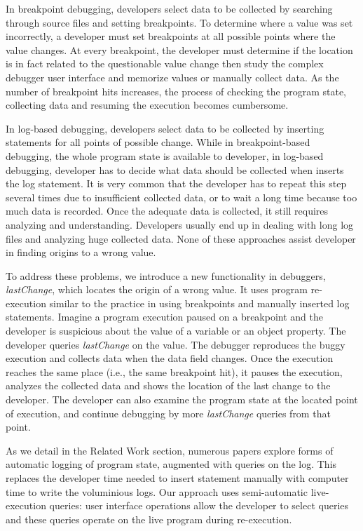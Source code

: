 \documentclass[runningheads,a4paper]{llncs}
\begin{document}
In breakpoint debugging, developers select data to be collected by
searching through source files and setting breakpoints. To determine
where a value was set incorrectly, a developer must set
breakpoints at all possible points where the value changes. At
every breakpoint, the developer must determine if the location is in
fact related to the questionable value change then study the complex
debugger user interface and memorize values or manually collect
data. As the number of breakpoint hits increases, the process of
checking the program state, collecting data and resuming the execution
becomes cumbersome.

In log-based debugging, developers select data to be collected by
inserting statements for all points of possible change.  While in
breakpoint-based debugging, the whole program state is available to
developer, in log-based debugging, developer has to decide what data
should be collected when inserts the log statement. It is very common
that the developer has to repeat this step several times due to
insufficient collected data, or to wait a long time because too much
data is recorded. Once the adequate data is collected, it still
requires analyzing and understanding. Developers usually end up in
dealing with long log files and analyzing huge collected data.  None
of these approaches assist developer in finding origins to a wrong
value.

To address these problems, we introduce a new functionality in
debuggers, \textit{lastChange}, which locates the origin of a wrong
value. It uses program re-execution similar to the practice
in using breakpoints and manually inserted log statements. 
Imagine a program execution 
paused on a breakpoint and the developer is
suspicious about the value of a variable or an object property. The
developer queries \textit{lastChange} on the value. The debugger
reproduces the buggy execution and collects data
when the data field changes. Once the execution reaches the same place 
(i.e., the same
breakpoint hit), it pauses the execution, analyzes the collected data
and shows the location of the last change to the developer. The
developer can also examine the program state at the located point of
execution, and continue debugging by more \textit{lastChange} queries
from that point.

As we detail in the Related Work section, numerous papers explore forms 
of automatic logging of program state, augmented with queries on the log. 
This replaces the developer time needed to 
insert statement manually with computer time to write the voluminious logs. 
Our approach uses semi-automatic live-execution queries: user interface 
operations allow the developer to select queries and these queries operate on the live program during re-execution.
\end{document}
